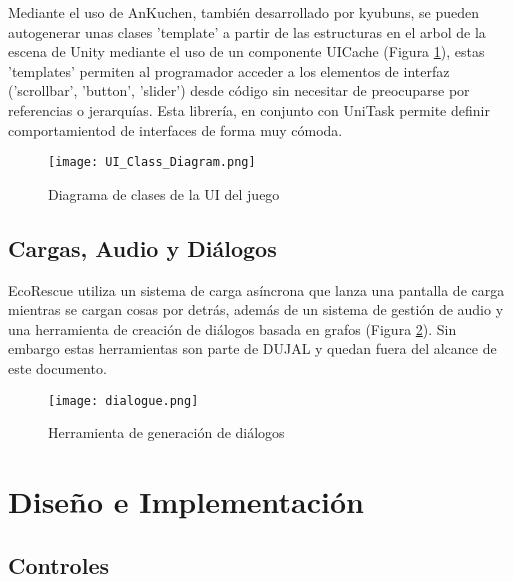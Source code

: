 Mediante el uso de AnKuchen\cite{AnKuchen}, también desarrollado por kyubuns, se pueden autogenerar unas clases 'template' a partir de las estructuras en el arbol de la escena de Unity mediante el uso de un componente UICache (Figura \ref{UIuml}), estas 'templates' permiten al programador acceder a los elementos de interfaz ('scrollbar', 'button', 'slider') desde código sin necesitar de preocuparse por referencias o jerarquías. Esta librería, en conjunto con UniTask\cite{UniTask} permite definir comportamientod de interfaces de forma muy cómoda.

\begin{figure}[H]
    \centering
      \texttt{[image: UI\_Class\_Diagram.png]}
    \caption{Diagrama de clases de la UI del juego}
    \label{UIuml}
\end{figure}

\subsection{Cargas, Audio y Diálogos}

EcoRescue utiliza un sistema de carga asíncrona que lanza una pantalla de carga mientras se cargan cosas por detrás, además de un sistema de gestión de audio y una herramienta de creación de diálogos basada en grafos (Figura \ref{fig:dialogue}). Sin embargo estas herramientas son parte de DUJAL\cite{DUJAL} y quedan fuera del alcance de este documento. 

\begin{figure}[H]
    \centering
      \texttt{[image: dialogue.png]}
    \caption{Herramienta de generación de diálogos}
    \label{fig:dialogue}
\end{figure}

\section{Diseño e Implementación} 

\subsection{Controles}

